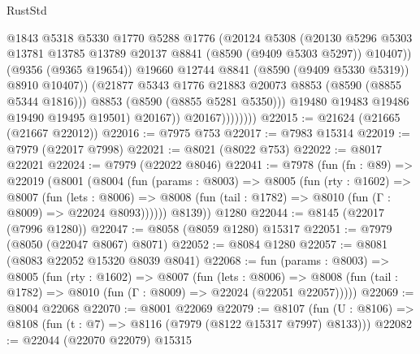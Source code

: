 \begin{lexlean}{RustStd}
\begin{coremodule}
                                @1843
                                @5318
                                @5330
                                @1770
                                @5288
                                @1776
                                (@20124
                                  @5308
                                  (@20130
                                    @5296
                                    @5303
                                    @13781
                                    @13785
                                    @13789
                                    @20137
                                    @8841
                                    (@8590 (@9409 @5303 @5297))
                                    @10407))
                                (@9356 (@9365 @19654))
                                @19660
                                @12744
                                @8841
                                (@8590 (@9409 @5330 @5319))
                                @8910
                                @10407))
                            (@21877 @5343 @1776 @21883 @20073 @8853 (@8590 (@8855 @5344 @1816)))
                            @8853
                            (@8590 (@8855 @5281 @5350)))
                          @19480
                          @19483
                          @19486
                          @19490
                          @19495
                          @19501)
                        @20167))
                    @20167))))))))
@22015 := @21624 (@21665 (@21667 @22012))
@22016 := @7975 @753
@22017 := @7983 @15314
@22019 := @7979 (@22017 @7998)
@22021 := @8021 (@8022 @753)
@22022 := @8017 @22021
@22024 := @7979 (@22022 @8046)
@22041 := @7978
    (fun (fn : @89) =>
    @22019
      (@8001
        (@8004
          (fun (params : @8003) =>
          @8005
            (fun (rty : @1602) =>
            @8007
              (fun (lets : @8006) =>
              @8008 (fun (tail : @1782) => @8010 (fun (Γ : @8009) => @22024 @8093))))))
        @8139))
    @1280
@22044 := @8145 (@22017 (@7996 @1280))
@22047 := @8058 (@8059 @1280) @15317
@22051 := @7979 (@8050 (@22047 @8067) @8071)
@22052 := @8084 @1280
@22057 := @8081 (@8083 @22052 @15320 @8039 @8041)
@22068 := fun (params : @8003) =>
  @8005
    (fun (rty : @1602) =>
    @8007
      (fun (lets : @8006) =>
      @8008 (fun (tail : @1782) => @8010 (fun (Γ : @8009) => @22024 (@22051 @22057)))))
@22069 := @8004 @22068
@22070 := @8001 @22069
@22079 := @8107
    (fun (U : @8106) => @8108 (fun (t : @7) => @8116 (@7979 (@8122 @15317 @7997) @8133)))
@22082 := @22044 (@22070 @22079) @15315

\end{coremodule}
\end{lexlean}
